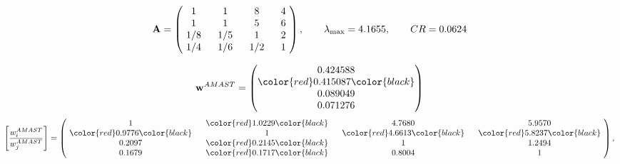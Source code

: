 \begin{example}
\begin{equation*}
\mathbf{A} =
\begin{pmatrix}
$\,\,$ 1 $\,\,$ & $\,\,$1$\,\,$ & $\,\,$8$\,\,$ & $\,\,$4 $\,\,$ \\
$\,\,$ 1 $\,\,$ & $\,\,$ 1 $\,\,$ & $\,\,$5$\,\,$ & $\,\,$6 $\,\,$ \\
$\,\,$ 1/8$\,\,$ & $\,\,$ 1/5$\,\,$ & $\,\,$ 1 $\,\,$ & $\,\,$2 $\,\,$ \\
$\,\,$ 1/4$\,\,$ & $\,\,$ 1/6$\,\,$ & $\,\,$ 1/2$\,\,$ & $\,\,$ 1  $\,\,$ \\
\end{pmatrix},
\qquad
\lambda_{\max} =
4.1655,
\qquad
CR = 0.0624
\end{equation*}

\begin{equation*}
\mathbf{w}^{AMAST} =
\begin{pmatrix}
0.424588\\
\color{red} 0.415087\color{black} \\
0.089049\\
0.071276
\end{pmatrix}\end{equation*}
\begin{equation*}
\left[ \frac{{w}^{AMAST}_i}{{w}^{AMAST}_j} \right] =
\begin{pmatrix}
$\,\,$ 1 $\,\,$ & $\,\,$\color{red} 1.0229\color{black} $\,\,$ & $\,\,$4.7680$\,\,$ & $\,\,$5.9570$\,\,$ \\
$\,\,$\color{red} 0.9776\color{black} $\,\,$ & $\,\,$ 1 $\,\,$ & $\,\,$\color{red} 4.6613\color{black} $\,\,$ & $\,\,$\color{red} 5.8237\color{black}   $\,\,$ \\
$\,\,$0.2097$\,\,$ & $\,\,$\color{red} 0.2145\color{black} $\,\,$ & $\,\,$ 1 $\,\,$ & $\,\,$1.2494 $\,\,$ \\
$\,\,$0.1679$\,\,$ & $\,\,$\color{red} 0.1717\color{black} $\,\,$ & $\,\,$0.8004$\,\,$ & $\,\,$ 1  $\,\,$ \\
\end{pmatrix},
\end{equation*}


\end{example}
